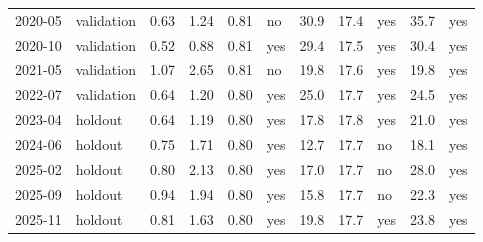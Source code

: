 \begin{table}
\begin{tabular}{llrrrlrrlrl}
2020-05 & validation & 0.63 & 1.24 & 0.81 & no & 30.9 & 17.4 & yes & 35.7 & yes \\
2020-10 & validation & 0.52 & 0.88 & 0.81 & yes & 29.4 & 17.5 & yes & 30.4 & yes \\
2021-05 & validation & 1.07 & 2.65 & 0.81 & no & 19.8 & 17.6 & yes & 19.8 & yes \\
2022-07 & validation & 0.64 & 1.20 & 0.80 & yes & 25.0 & 17.7 & yes & 24.5 & yes \\
2023-04 & holdout & 0.64 & 1.19 & 0.80 & yes & 17.8 & 17.8 & yes & 21.0 & yes \\
2024-06 & holdout & 0.75 & 1.71 & 0.80 & yes & 12.7 & 17.7 & no & 18.1 & yes \\
2025-02 & holdout & 0.80 & 2.13 & 0.80 & yes & 17.0 & 17.7 & no & 28.0 & yes \\
2025-09 & holdout & 0.94 & 1.94 & 0.80 & yes & 15.8 & 17.7 & no & 22.3 & yes \\
2025-11 & holdout & 0.81 & 1.63 & 0.80 & yes & 19.8 & 17.7 & yes & 23.8 & yes \\
\bottomrule
\end{tabular}
\end{table}
